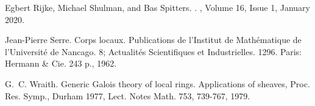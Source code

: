 \documentclass[10pt,a4paper]{article}
\theoremstyle{definition}
\begin{document}
\begin{thebibliography}{10}
Egbert Rijke, Michael Shulman, and Bas Spitters.
.
, {Volume 16, Issue 1},
  January 2020.

Jean-Pierre Serre.
\newblock Corps locaux.
\newblock Publications de l'{Institut} de {Math{\'e}matique} de
  l'{Universit{\'e}} de {Nancago}. 8; {Actualit{\'e}s} {Scientifiques} et
  {Industrielles}. 1296. {Paris}: {Hermann} \& {Cie}. 243 p., 1962.

G.~C. Wraith.
\newblock Generic {Galois} theory of local rings.
\newblock Applications of sheaves, {Proc}. {Res}. {Symp}., {Durham} 1977,
  {Lect}. {Notes} {Math}. 753, 739-767, 1979.

\end{thebibliography}
\end{document}
